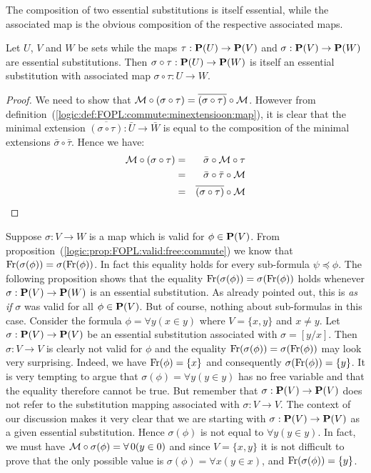 The composition of two essential substitutions is itself essential,
while the associated map is the obvious composition of the
respective associated maps.
\begin{prop}\label{logic:prop:FOPL:esssubstprop:composition}
Let $U$, $V$ and $W$ be sets while the maps $\tau:{\bf P}(U)\to\mbox{${\bf P}(V)$}$
and $\sigma:\mbox{${\bf P}(V)$}\to{\bf P}(W)$ are essential substitutions. Then
$\sigma\circ\tau:{\bf P}(U)\to{\bf P}(W)$ is itself an essential
substitution with associated map $\sigma\circ\tau:U\to W$.
\end{prop}
\begin{proof}
We need to show that ${\cal
M}\circ(\sigma\circ\tau)=\overline{(\sigma\circ\tau)}\circ{\cal M}$.
However from
definition~(\ref{logic:def:FOPL:commute:minextensioon:map}), it is
clear that the minimal extension
$\overline{(\sigma\circ\tau)}:\bar{U}\to\bar{W}$ is equal to the
composition of the minimal extensions $\bar{\sigma}\circ\bar{\tau}$.
Hence we have:
    \begin{eqnarray*}
    {\cal M}\circ(\sigma\circ\tau)
    &=&\bar{\sigma}\circ{\cal
    M}\circ\tau\\
    &=&\bar{\sigma}\circ\bar{\tau}\circ{\cal
    M}\\
    &=&\overline{(\sigma\circ\tau)}\circ{\cal
    M}\\
    \end{eqnarray*}
\end{proof}

Suppose $\sigma:V\to W$ is a map which is valid for $\phi\in\mbox{${\bf P}(V)$}$.
From proposition~(\ref{logic:prop:FOPL:valid:free:commute}) we know
that $\mbox{\rm Fr}(\sigma(\phi))=\sigma(\mbox{\rm Fr}(\phi))$. In fact this
equality holds for every sub-formula $\psi\preceq\phi$. The
following proposition shows that the equality
$\mbox{\rm Fr}(\sigma(\phi))=\sigma(\mbox{\rm Fr}(\phi))$ holds whenever
$\sigma:\mbox{${\bf P}(V)$}\to{\bf P}(W)$ is an essential substitution. As already
pointed out, this is {\em as if} $\sigma$ was valid for all
$\phi\in\mbox{${\bf P}(V)$}$. But of course, nothing about sub-formulas in this
case. Consider the formula $\phi=\forall y(x\in y)$ where
$V=\{x,y\}$ and $x\neq y$. Let $\sigma:\mbox{${\bf P}(V)$}\to\mbox{${\bf P}(V)$}$ be an essential
substitution associated with $\sigma=[y/x]$. Then $\sigma:V\to V$ is
clearly not valid for $\phi$ and the equality
$\mbox{\rm Fr}(\sigma(\phi))=\sigma(\mbox{\rm Fr}(\phi))$ may look very surprising.
Indeed, we have $\mbox{\rm Fr}(\phi)=\{x\}$ and consequently
$\sigma(\mbox{\rm Fr}(\phi))=\{y\}$. It is very tempting to argue that
$\sigma(\phi)=\forall y(y\in y)$ has no free variable and that the
equality therefore cannot be true. But remember that
$\sigma:\mbox{${\bf P}(V)$}\to\mbox{${\bf P}(V)$}$ does not refer to the substitution mapping
associated with $\sigma:V\to V$. The context of our discussion makes
it very clear that we are starting with $\sigma:\mbox{${\bf P}(V)$}\to\mbox{${\bf P}(V)$}$ as a
given essential substitution. Hence $\sigma(\phi)$ is not equal to
$\forall y(y\in y)$. In fact, we must have ${\cal
M}\circ\sigma(\phi)=\forall\,0(y\in 0)$ and since $V=\{x,y\}$ it is
not difficult to prove that the only possible value is
$\sigma(\phi)=\forall x(y\in x)$, and $\mbox{\rm Fr}(\sigma(\phi))=\{y\}$.

